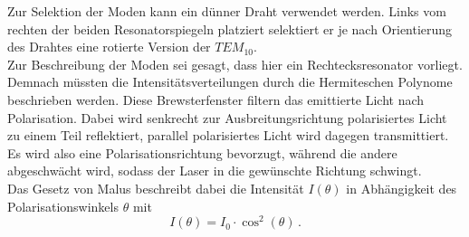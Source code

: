 Zur Selektion der Moden kann ein dünner Draht verwendet werden.
Links vom rechten der beiden Resonatorspiegeln platziert selektiert er je nach Orientierung des Drahtes eine rotierte Version der $TEM_{10}$. \\

Zur Beschreibung der Moden sei gesagt, dass hier ein Rechtecksresonator vorliegt. 
Demnach müssten die Intensitätsverteilungen durch die Hermiteschen Polynome beschrieben werden. 
Diese Brewsterfenster filtern das emittierte Licht nach Polarisation. 
Dabei wird senkrecht zur Ausbreitungsrichtung polarisiertes Licht zu einem Teil reflektiert, parallel polarisiertes Licht wird dagegen transmittiert.
Es wird also eine Polarisationsrichtung bevorzugt, während die andere abgeschwächt wird, sodass der Laser in die gewünschte Richtung schwingt.  \\
Das Gesetz von Malus beschreibt dabei die Intensität $I(\theta)$ in Abhängigkeit des Polarisationswinkels $\theta$ mit 
\begin{equation}
    I(\theta) = I_0 \cdot \cos^2(\theta) \,.
    \label{eq:malus}
\end{equation}





